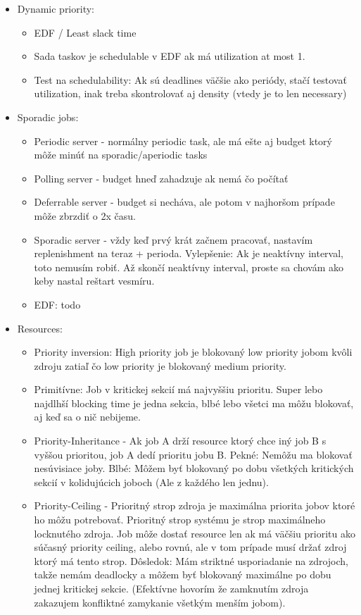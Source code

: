 \documentclass[paper=a4, fontsize=11pt]{scrartcl} %
\numberwithin{equation}{section} %
\numberwithin{figure}{section} %
\numberwithin{table}{section} %
\begin{document}
\begin{itemize}
		\item Dynamic priority:
		
		\begin{itemize}
			\item EDF / Least slack time
			\item Sada taskov je schedulable v EDF ak má utilization at most 1.
			\item Test na schedulability: Ak sú deadlines väčšie ako periódy, stačí testovať utilization, inak treba skontrolovať aj density (vtedy je to len necessary)
		\end{itemize}
	
		\item Sporadic jobs:
		
		\begin{itemize}
			\item Periodic server - normálny periodic task, ale má ešte aj budget ktorý môže minúť na sporadic/aperiodic tasks
			\item Polling server - budget hneď zahadzuje ak nemá čo počítať
			\item Deferrable server - budget si necháva, ale potom v najhoršom prípade môže zbrzdiť o 2x času.
			\item Sporadic server - vždy keď prvý krát začnem pracovať, nastavím replenishment na teraz + perioda. Vylepšenie: Ak je neaktívny interval, toto nemusím robiť. Až skončí neaktívny interval, proste sa chovám ako keby nastal reštart vesmíru.
			\item EDF: todo
		\end{itemize}
	
		\item Resources:
		
		\begin{itemize}
			\item Priority inversion: High priority job je blokovaný low priority jobom kvôli zdroju zatiaľ čo low priority je blokovaný medium priority.
			\item Primitívne: Job v kritickej sekcií má najvyššiu prioritu. Super lebo najdlhší blocking time je jedna sekcia, blbé lebo všetci ma môžu blokovať, aj keď sa o nič nebijeme.
			\item Priority-Inheritance - Ak job A drží resource ktorý chce iný job B s vyššou prioritou, job A dedí prioritu jobu B. Pekné: Nemôžu ma blokovať nesúvisiace joby. Blbé: Môžem byť blokovaný po dobu všetkých kritických sekcií v kolidujúcich joboch (Ale z každého len jednu).
			\item Priority-Ceiling - Prioritný strop zdroja je maximálna priorita jobov ktoré ho môžu potrebovať. Prioritný strop systému je strop maximálneho locknutého zdroja. Job môže dostať resource len ak má väčšiu prioritu ako súčasný priority ceiling, alebo rovnú, ale v tom prípade musí držať zdroj ktorý má tento strop. Dôsledok: Mám striktné usporiadanie na zdrojoch, takže nemám deadlocky a môžem byť blokovaný maximálne po dobu jednej kritickej sekcie. (Efektívne hovorím že zamknutím zdroja zakazujem konfliktné zamykanie všetkým menším jobom).
		\end{itemize}
	\end{itemize}
\end{document}
